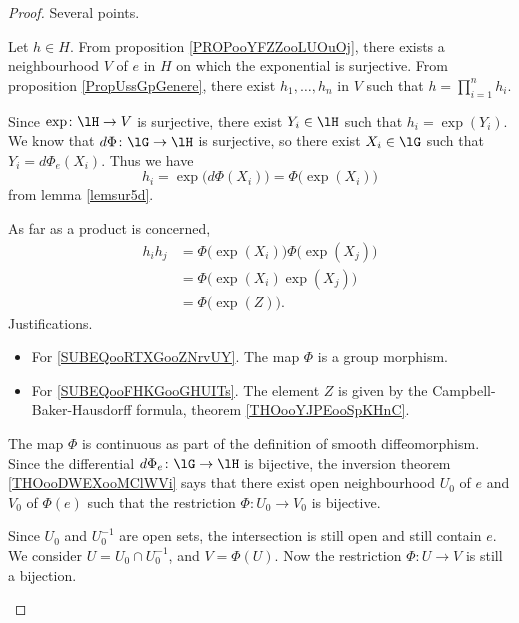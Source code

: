 \begin{proof}
	Several points.
	\begin{subproof}
		Let \( h\in H\). From proposition \ref{PROPooYFZZooLUOuOj}, there exists a neighbourhood \( V\) of \( e\) in \( H\) on which the exponential is surjective. From proposition \ref{PropUssGpGenere}, there exist \( h_1,\ldots, h_n\) in \( V\) such that \( h=\prod_{i=1}^nh_i\).

		Since \( \exp\colon \lH\to V\) is surjective, there exist \( Y_i\in \lH\) such that \( h_i=\exp(Y_i)\). We know that \( d\Phi\colon \lG\to \lH\) is surjective, so there exist \( X_i\in\lG\) such that \( Y_i=d\Phi_e(X_i)\). Thus we have
		\begin{equation}
			h_i=\exp\big( d\Phi(X_i) \big)=\Phi\big( \exp(X_i) \big)
		\end{equation}
		from lemma \ref{lemsur5d}.

		As far as a product is concerned,
		\begin{subequations}
			\begin{align}
				h_ih_j & =\Phi\big( \exp(X_i) \big)\Phi\big( \exp(X_j) \big)                \\
				       & =\Phi\big( \exp(X_i)\exp(X_j) \big)    \label{SUBEQooRTXGooZNrvUY} \\
				       & =\Phi\big( \exp(Z) \big).      \label{SUBEQooFHKGooGHUITs}
			\end{align}
		\end{subequations}
		Justifications.
		\begin{itemize}
			\item For \eqref{SUBEQooRTXGooZNrvUY}. The map \( \Phi\) is a group morphism.
			\item For \eqref{SUBEQooFHKGooGHUITs}. The element \( Z\) is given by the Campbell-Baker-Hausdorff formula, theorem \ref{THOooYJPEooSpKHnC}.
		\end{itemize}
		\spitem[Continuous]
		The map \( \Phi\) is continuous as part of the definition of smooth diffeomorphism.
		Since the differential \( d\Phi_e\colon \lG\to \lH\) is bijective, the inversion theorem \ref{THOooDWEXooMClWVi} says that there exist open neighbourhood \( U_0\) of \( e\) and \( V_0\) of \( \Phi(e)\) such that  the restriction \( \Phi\colon U_0\to V_0\) is bijective.

		Since \( U_0\) and \( U_0^{-1}\) are open sets, the intersection is still open and still contain \( e\). We consider \( U=U_0\cap U_0^{-1}\), and \( V=\Phi(U)\). Now the restriction \( \Phi\colon U\to V\) is still a bijection.


\end{subproof}
\end{proof}
